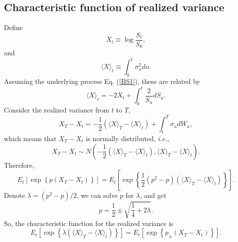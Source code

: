 \documentclass[12pt]{article}
\begin{document}
    \subsection{Characteristic function of realized variance}
    Define
    \begin{equation}
      X_t\equiv\log\frac{S_t}{S_0},
    \end{equation}
    and
    \begin{equation}
      \langle X \rangle_t\equiv\int_0^t\sigma_u^2du.
    \end{equation}
    Assuming the underlying process Eq. (\ref{BS1}), these are related by
    \begin{equation}
      \langle X \rangle_t=-2X_t+\int_0^t\frac{2}{S_u}dS_u.
    \end{equation}
    Consider the realized variance from $t$ to $T$,
    \begin{equation}
      X_T-X_t=-\frac{1}{2}\left(\langle X \rangle_T - \langle X \rangle_t\right) + \int_t^T\sigma_udW_u,
    \end{equation}
    which means that $X_T-X_t$ is normally distributed, {\it i.e.},
    \begin{equation}
      X_T-X_t\sim N\left(-\frac{1}{2}\left(\langle X \rangle_T - \langle X \rangle_t\right), \langle X \rangle_T - \langle X \rangle_t\right).
    \end{equation}
    Therefore,
    \begin{equation}
      E_t\left[\exp\left\{p\left(X_T-X_t\right)\right\}\right] =
      E_t\left[\exp\left\{\frac{1}{2}\left(p^2-p\right)\left(\langle X \rangle_T - \langle X \rangle_t\right)\right\}\right].
    \end{equation}
    Denote $\lambda=(p^2-p)/2$, we can solve $p$ for $\lambda$, and get
    \begin{equation}
      p=\frac{1}{2}\pm\sqrt{\frac{1}{4}+2\lambda}.
    \end{equation}
    So, the characteristic function for the realized variance is
    \begin{equation}
    E_t\left[\exp\left\{\lambda\left(\langle X \rangle_T - \langle X \rangle_t\right)\right\}\right]
       = E_t\left[\exp\left\{p_{\pm}\left(X_T-X_t\right)\right\}\right].
    \end{equation}
\end{document}
